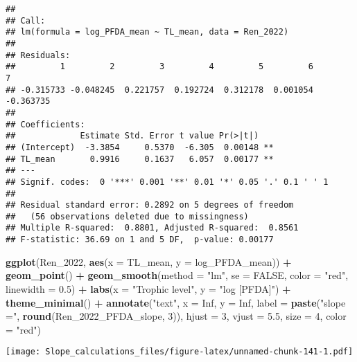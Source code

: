 \documentclass[
]{article}
\newenvironment{Shaded}{\begin{snugshade}}{\end{snugshade}}
\newcommand{\AttributeTok}[1]{\textcolor[rgb]{0.13,0.29,0.53}{#1}}
\newcommand{\ConstantTok}[1]{\textcolor[rgb]{0.56,0.35,0.01}{#1}}
\newcommand{\DecValTok}[1]{\textcolor[rgb]{0.00,0.00,0.81}{#1}}
\newcommand{\FloatTok}[1]{\textcolor[rgb]{0.00,0.00,0.81}{#1}}
\newcommand{\FunctionTok}[1]{\textcolor[rgb]{0.13,0.29,0.53}{\textbf{#1}}}
\newcommand{\NormalTok}[1]{#1}
\newcommand{\SpecialCharTok}[1]{\textcolor[rgb]{0.81,0.36,0.00}{\textbf{#1}}}
\newcommand{\StringTok}[1]{\textcolor[rgb]{0.31,0.60,0.02}{#1}}
\begin{document}
\begin{verbatim}
## 
## Call:
## lm(formula = log_PFDA_mean ~ TL_mean, data = Ren_2022)
## 
## Residuals:
##         1         2         3         4         5         6         7 
## -0.315733 -0.048245  0.221757  0.192724  0.312178  0.001054 -0.363735 
## 
## Coefficients:
##             Estimate Std. Error t value Pr(>|t|)   
## (Intercept)  -3.3854     0.5370  -6.305  0.00148 **
## TL_mean       0.9916     0.1637   6.057  0.00177 **
## ---
## Signif. codes:  0 '***' 0.001 '**' 0.01 '*' 0.05 '.' 0.1 ' ' 1
## 
## Residual standard error: 0.2892 on 5 degrees of freedom
##   (56 observations deleted due to missingness)
## Multiple R-squared:  0.8801, Adjusted R-squared:  0.8561 
## F-statistic: 36.69 on 1 and 5 DF,  p-value: 0.00177
\end{verbatim}

\begin{Shaded}
\begin{Highlighting}[]
\FunctionTok{ggplot}\NormalTok{(Ren\_2022, }\FunctionTok{aes}\NormalTok{(}\AttributeTok{x =}\NormalTok{ TL\_mean, }\AttributeTok{y =}\NormalTok{ log\_PFDA\_mean)) }\SpecialCharTok{+}
  \FunctionTok{geom\_point}\NormalTok{() }\SpecialCharTok{+}
  \FunctionTok{geom\_smooth}\NormalTok{(}\AttributeTok{method =} \StringTok{"lm"}\NormalTok{, }\AttributeTok{se =} \ConstantTok{FALSE}\NormalTok{, }\AttributeTok{color =} \StringTok{"red"}\NormalTok{, }\AttributeTok{linewidth =} \FloatTok{0.5}\NormalTok{) }\SpecialCharTok{+}
  \FunctionTok{labs}\NormalTok{(}\AttributeTok{x =} \StringTok{"Trophic level"}\NormalTok{,}
       \AttributeTok{y =} \StringTok{"log [PFDA]"}\NormalTok{) }\SpecialCharTok{+}
  \FunctionTok{theme\_minimal}\NormalTok{() }\SpecialCharTok{+}
  \FunctionTok{annotate}\NormalTok{(}\StringTok{"text"}\NormalTok{, }\AttributeTok{x =} \ConstantTok{Inf}\NormalTok{, }\AttributeTok{y =} \ConstantTok{Inf}\NormalTok{, }\AttributeTok{label =} \FunctionTok{paste}\NormalTok{(}\StringTok{"slope ="}\NormalTok{, }\FunctionTok{round}\NormalTok{(Ren\_2022\_PFDA\_slope, }\DecValTok{3}\NormalTok{)), }
           \AttributeTok{hjust =} \DecValTok{3}\NormalTok{, }\AttributeTok{vjust =} \FloatTok{5.5}\NormalTok{, }\AttributeTok{size =} \DecValTok{4}\NormalTok{, }\AttributeTok{color =} \StringTok{"red"}\NormalTok{)}
\end{Highlighting}
\end{Shaded}

\texttt{[image: Slope\_calculations\_files/figure-latex/unnamed-chunk-141-1.pdf]}
\end{document}
